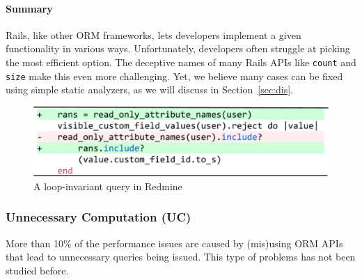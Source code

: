 \vspace{-0.08in} 
\paragraph{\bf{Summary}} Rails, like other ORM frameworks, lets developers implement a given functionality in various ways.
Unfortunately, developers often struggle at 
picking the most efficient option. The deceptive names of many 
Rails APIs like \texttt{count} and \texttt{size} make this even more challenging. Yet, we believe many cases can be fixed using simple static analyzers, as we will discuss in Section~\ref{sec:dis}.

\begin{figure}
  \centering
  \includegraphics[width=0.7\columnwidth]{hownotto/redCom}
  \caption{A loop-invariant query in Redmine}
  \label{fig:redCom}
\end{figure}

\subsubsection{Unnecessary Computation (UC)} 
\label{sec:uncomp}
More than 10\% of the performance issues are caused by (mis)using ORM APIs that lead to unnecessary queries being issued. This type of problems has not been studied before.
\vspace{-0.08in} 
